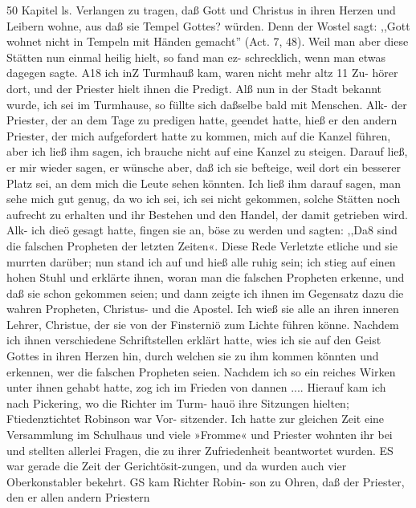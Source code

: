 
50 Kapitel ls.
Verlangen zu tragen, daß Gott und Christus in ihren Herzen
und Leibern wohne, aus daß sie Tempel Gottes? würden. Denn
der Wostel sagt: ,,Gott wohnet nicht in Tempeln mit Händen
gemacht'' (Act. 7, 48). Weil man aber diese Stätten nun einmal
heilig hielt, so fand man ez- schrecklich, wenn man etwas dagegen
sagte. A18 ich inZ Turmhauß kam, waren nicht mehr altz 11 Zu-
hörer dort, und der Priester hielt ihnen die Predigt. Alß nun
in der Stadt bekannt wurde, ich sei im Turmhause, so füllte sich
daßselbe bald mit Menschen. Alk- der Priester, der an dem Tage
zu predigen hatte, geendet hatte, hieß er den andern Priester, der
mich aufgefordert hatte zu kommen, mich auf die Kanzel führen,
aber ich ließ ihm sagen, ich brauche nicht auf eine Kanzel zu
steigen. Darauf ließ, er mir wieder sagen, er wünsche aber, daß
ich sie befteige, weil dort ein besserer Platz sei, an dem mich die
Leute sehen könnten. Ich ließ ihm darauf sagen, man sehe mich
gut genug, da wo ich sei, ich sei nicht gekommen, solche Stätten
noch aufrecht zu erhalten und ihr Bestehen und den Handel, der
damit getrieben wird. Alk- ich dieö gesagt hatte, fingen sie an,
böse zu werden und sagten: ,,Da8 sind die falschen Propheten
der letzten Zeiten«. Diese Rede Verletzte etliche und sie murrten
darüber; nun stand ich auf und hieß alle ruhig sein; ich stieg
auf einen hohen Stuhl und erklärte ihnen, woran man die falschen
Propheten erkenne, und daß sie schon gekommen seien; und dann
zeigte ich ihnen im Gegensatz dazu die wahren Propheten, Christus-
und die Apostel. Ich wieß sie alle an ihren inneren Lehrer,
Christue, der sie von der Finsterniö zum Lichte führen könne.
Nachdem ich ihnen verschiedene Schriftstellen erklärt hatte, wies
ich sie auf den Geist Gottes in ihren Herzen hin, durch welchen
sie zu ihm kommen könnten und erkennen, wer die falschen
Propheten seien. Nachdem ich so ein reiches Wirken unter ihnen
gehabt hatte, zog ich im Frieden von dannen ....
Hierauf kam ich nach Pickering, wo die Richter im Turm-
hauö ihre Sitzungen hielten; Ftiedenztichtet Robinson war Vor-
sitzender. Ich hatte zur gleichen Zeit eine Versammlung im
Schulhaus und viele »Fromme« und Priester wohnten ihr bei
und stellten allerlei Fragen, die zu ihrer Zufriedenheit beantwortet
wurden. ES war gerade die Zeit der Gerichtösit-zungen, und da
wurden auch vier Oberkonstabler bekehrt. GS kam Richter Robin-
son zu Ohren, daß der Priester, den er allen andern Priestern


